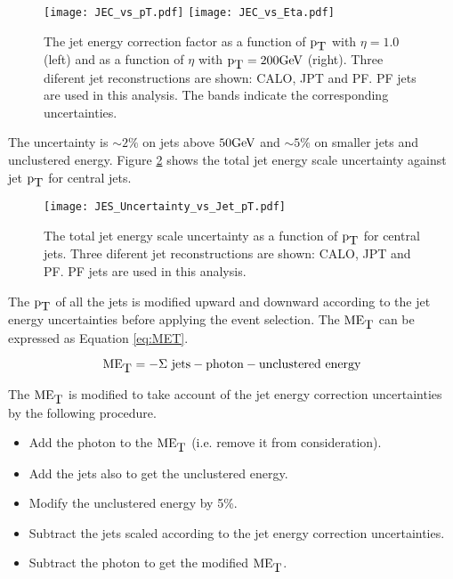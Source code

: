 \begin{figure}
\texttt{[image: JEC\_vs\_pT.pdf]}
\texttt{[image: JEC\_vs\_Eta.pdf]}
\caption{The jet energy correction factor as a function of $\mbox{p}_{\mbox{T}}$ with $\eta =
1.0$ (left) and as a function of $\eta$ with $\mbox{p}_{\mbox{T}} = 200 \mbox{GeV}$ (right). Three
diferent jet reconstructions are shown: CALO, JPT and PF. PF jets are used in
this analysis. The bands indicate the corresponding uncertainties.}
\label{fig:JEC_vs_pT_And_Eta}
\end{figure}

The uncertainty is $\sim 2\%$ on jets above $50\mbox{GeV}$ and $\sim 5\%$ on smaller 
jets and unclustered energy. Figure \ref{fig:JES_Uncertainty_vs_Jet_pT} shows 
the total jet energy scale uncertainty against jet $\mbox{p}_{\mbox{T}}$ for central jets. \\

\begin{figure}
\begin{center}
\texttt{[image: JES\_Uncertainty\_vs\_Jet\_pT.pdf]}
\end{center}
\caption{The total jet energy scale uncertainty as a function of $\mbox{p}_{\mbox{T}}$ for
central jets. Three diferent jet reconstructions are shown: CALO, JPT and PF. 
PF jets are used in this analysis.}
\label{fig:JES_Uncertainty_vs_Jet_pT}
\end{figure}

The $\mbox{p}_{\mbox{T}}$ of all the jets is modified upward and downward according to the jet 
energy uncertainties before applying the event selection. The $\mbox{ME}_{\mbox{T}}$ can be 
expressed as Equation \ref{eq:MET}.

\begin{equation}
\mbox{ME}_{\mbox{T}} = -\Sigma \mbox{ jets} - \mbox{photon} - \mbox{unclustered energy}
\label{eq:MET}
\end{equation}

The $\mbox{ME}_{\mbox{T}}$ is modified to take account of the jet energy correction
uncertainties by the following procedure. 

\begin{itemize}
\item Add the photon to the $\mbox{ME}_{\mbox{T}}$ (i.e. remove it from consideration).
\item Add the jets also to get the unclustered energy.
\item Modify the unclustered energy by 5\%.
\item Subtract the jets scaled according to the jet energy correction 
uncertainties.
\item Subtract the photon to get the modified $\mbox{ME}_{\mbox{T}}$.
\end{itemize}

